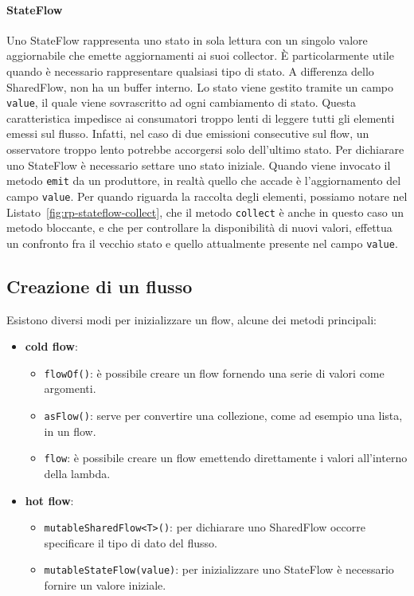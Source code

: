\documentclass[12pt,a4paper,openright,twoside]{book}
\begin{document}
\paragraph{StateFlow}
Uno StateFlow rappresenta uno stato in sola lettura con un singolo valore aggiornabile che emette aggiornamenti ai suoi collector. È particolarmente utile quando è necessario rappresentare qualsiasi tipo di stato. 
A differenza dello SharedFlow, non ha un buffer interno. Lo stato viene gestito tramite un campo \texttt{value}, il quale viene sovrascritto ad ogni cambiamento di stato. 
Questa caratteristica impedisce ai consumatori troppo lenti di leggere tutti gli elementi emessi sul flusso. Infatti, nel caso di due emissioni consecutive sul flow, un osservatore troppo lento potrebbe accorgersi solo dell'ultimo stato. 
Per dichiarare uno StateFlow è necessario settare uno stato iniziale. 
Quando viene invocato il metodo \texttt{emit} da un produttore, in realtà quello che accade è l'aggiornamento del campo \texttt{value}. 
Per quando riguarda la raccolta degli elementi, possiamo notare nel Listato~\ref{fig:rp-stateflow-collect}, che il metodo \texttt{collect} è anche in questo caso un metodo bloccante, e che per controllare la disponibilità di nuovi valori, effettua un confronto fra il vecchio stato e quello attualmente presente nel campo \texttt{value}. 



\subsection{Creazione di un flusso}
Esistono diversi modi per inizializzare un flow, alcune dei metodi principali: 

    \begin{itemize}
        \item \textbf{cold flow}: 
        \begin{itemize}
            \item \texttt{flowOf()}: è possibile creare un flow fornendo una serie di valori come argomenti. 
            \item \texttt{asFlow()}: serve per convertire una collezione, come ad esempio una lista, in un flow. 
            \item \texttt{flow\string{\string}}: è possibile creare un flow emettendo direttamente i valori all'interno della lambda. 
        \end{itemize}
        \item \textbf{hot flow}: 
        \begin{itemize}
            \item \texttt{mutableSharedFlow<T>()}: per dichiarare uno SharedFlow occorre specificare il tipo di dato del flusso. 
            \item \texttt{mutableStateFlow(value)}: per inizializzare uno StateFlow è necessario fornire un valore iniziale. 
        \end{itemize}
    \end{itemize}
   
\end{document}
